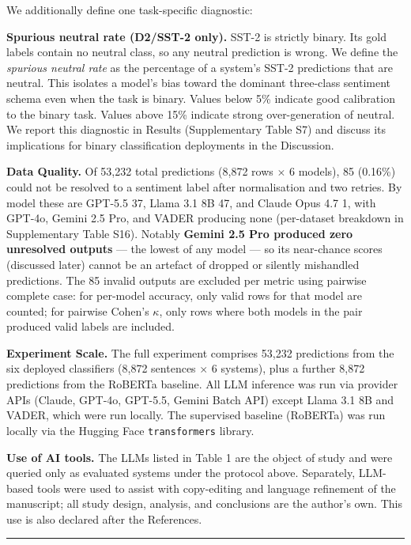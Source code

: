 \documentclass[11pt]{article}
\begin{document}
We additionally define one task-specific diagnostic:

\textbf{Spurious neutral rate (D2/SST-2 only).} SST-2 is strictly
binary. Its gold labels contain no neutral class, so any neutral
prediction is wrong. We define the \emph{spurious neutral rate} as the
percentage of a system's SST-2 predictions that are neutral. This
isolates a model's bias toward the dominant three-class sentiment schema
even when the task is binary. Values below 5\% indicate good calibration
to the binary task. Values above 15\% indicate strong over-generation of
neutral. We report this diagnostic in Results (Supplementary Table S7)
and discuss its implications for binary classification deployments in
the Discussion.

\textbf{Data Quality.} Of 53,232 total predictions (8,872 rows $\times$ 6
models), 85 (0.16\%) could not be resolved to a sentiment label after
normalisation and two retries. By model these are GPT-5.5 37, Llama 3.1
8B 47, and Claude Opus 4.7 1, with GPT-4o, Gemini 2.5 Pro, and VADER
producing none (per-dataset breakdown in Supplementary Table S16).
Notably \textbf{Gemini 2.5 Pro produced zero unresolved outputs} --- the
lowest of any model --- so its near-chance scores (discussed later)
cannot be an artefact of dropped or silently mishandled predictions. The
85 invalid outputs are excluded per metric using pairwise complete case:
for per-model accuracy, only valid rows for that model are counted; for
pairwise Cohen's $\kappa$, only rows where both models in the pair produced
valid labels are included.

\textbf{Experiment Scale.} The full experiment comprises 53,232
predictions from the six deployed classifiers (8,872 sentences $\times$ 6
systems), plus a further 8,872 predictions from the RoBERTa baseline.
All LLM inference was run via provider APIs (Claude, GPT-4o, GPT-5.5,
Gemini Batch API) except Llama 3.1 8B and VADER, which were run locally.
The supervised baseline (RoBERTa) was run locally via the Hugging Face
\texttt{transformers} library.

\textbf{Use of AI tools.} The LLMs listed in Table 1 are the object of
study and were queried only as evaluated systems under the protocol
above. Separately, LLM-based tools were used to assist with copy-editing
and language refinement of the manuscript; all study design, analysis,
and conclusions are the author's own. This use is also declared after
the References.

\begin{center}\rule{0.5\linewidth}{0.5pt}\end{center}
\end{document}
